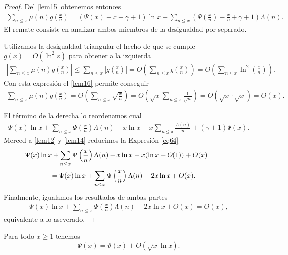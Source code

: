 \begin{proof}
Del \cref{lem15} obtenemos entonces 
\begin{align}
\sum_{n \leq x} \mu(n) g\left(\frac{x}{n}\right) = 
(\Psi(x) - x + \gamma + 1) \ln x + \sum_{n \leq x} \left(\Psi\left(\frac{x}{n}\right) - \frac{x}{n} + \gamma + 1\right) \Lambda(n). 
\end{align}
El remate consiste en analizar ambos miembros de la desigualdad por separado. 

Utilizamos la desigualdad triangular el hecho de que se cumple $g(x) = O(\ln^2 x)$ para obtener a la izquierda 
\begin{align}
\left | \sum_{n \leq x} \mu(n) g\left(\frac{x}{n}\right) \right|  \leq \sum_{n \leq x} \left| g\left(\frac{x}{n}\right) \right| 
= O\left(\sum_{n \leq x} g\left(\frac{x}{n}\right)\right) 
= O\left(\sum_{n \leq x} \ln^2 \left(\frac{x}{n}\right)\right).
\end{align}
Con esta expresi\'on el \cref{lem16} permite conseguir
\begin{align}
\sum_{n \leq x} \mu(n) g\left(\frac{x}{n}\right) = O\left(\sum_{n \leq x} \sqrt{\frac{x}{n}}\right) 
= O\left(\sqrt{x} \sum_{n \leq x} \frac{1}{\sqrt{n}}\right) = O\left( \sqrt{x}\cdot \sqrt{x}\right)=O(x). 
\end{align}

El t\'ermino de la derecha lo reordenamos cual 
\begin{align}
 \Psi(x)\ln x + \sum_{n \leq x} \Psi\left(\frac{x}{n}\right)\Lambda(n) - x \ln x - x \sum_{n \leq x} \frac{\Lambda(n)}{n} + (\gamma + 1)\Psi(x).\label{eq64}
\end{align}
Merced a \cref{lem12} y \cref{lem14} reducimos la Expresi\'on \ref{eq64}
\begin{align}
& \hskip -0.5in  \Psi(x)\ln x + \sum_{n \leq x} \Psi\left(\frac{x}{n}\right)\Lambda(n) - x \ln x - x(\ln x + O(1)) + O(x)\\
&= \Psi(x)\ln x + \sum_{n \leq x} \Psi\left(\frac{x}{n}\right)\Lambda(n) - 2x \ln x + O(x).
\end{align}
Finalmente, igualamos los resultados de ambas partes
\begin{align}
\Psi(x)\ln x + \sum_{n \leq x} \Psi\left(\frac{x}{n}\right)\Lambda(n) - 2x \ln x + O(x) = O(x), 
\end{align}
equivalente a lo aseverado. 
\end{proof}

\begin{lemma}\label{lem18}
Para todo $x \geq 1$ tenemos
\[
\Psi(x) = \vartheta(x) + O(\sqrt{x}\ln x).
\]
\end{lemma}

